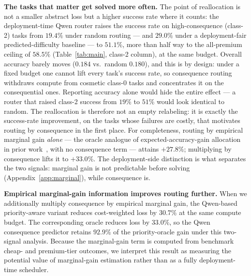 \documentclass{article}
\begin{document}
\textbf{The tasks that matter get solved more often.} The point of
reallocation is not a smaller abstract loss but a higher success rate
where it counts: the deployment-time Qwen router raises the success
rate on high-consequence (class-2) tasks from $19.4\%$ under random
routing --- and $29.0\%$ under a deployment-fair predicted-difficulty
baseline --- to $\mathbf{51.1\%}$, more than half way to the
all-premium ceiling of $58.5\%$ (Table~\ref{tab:main}, class-2 column),
at the same budget. Overall accuracy barely moves ($0.184$ vs.\ random
$0.180$), and this is by design: under a fixed budget one cannot lift
every task's success rate, so consequence routing withdraws compute
from cosmetic class-0 tasks and concentrates it on the consequential
ones. Reporting accuracy alone would hide the entire effect --- a
router that raised class-2 success from $19\%$ to $51\%$ would look
identical to random. The reallocation is therefore not an empty
relabeling: it is exactly the success-rate improvement, on the tasks
whose failures are costly, that motivates routing by consequence in
the first place. For
completeness, routing by empirical marginal gain \emph{alone} --- the
oracle analogue of expected-accuracy-gain allocation in prior
work~\citep{damani2024learning}, with no consequence term --- attains
$+27.8\%$; multiplying by consequence lifts it to $+33.0\%$. The
deployment-side distinction is what separates the two signals:
marginal gain is not predictable before solving
(Appendix~\ref{app:marginal}), while consequence is.

\textbf{Empirical marginal-gain information improves routing further.}
When we additionally multiply consequence by empirical marginal gain,
the Qwen-based priority-aware variant reduces cost-weighted loss by
$30.7\%$ at the same compute budget. The corresponding oracle reduces
loss by $33.0\%$, so the Qwen consequence predictor retains $92.9\%$
of the priority-oracle gain under this two-signal analysis. Because
the marginal-gain term is computed from benchmark cheap- and
premium-tier outcomes, we interpret this result as measuring the
potential value of marginal-gain estimation rather than as a fully
deployment-time scheduler.
\end{document}
